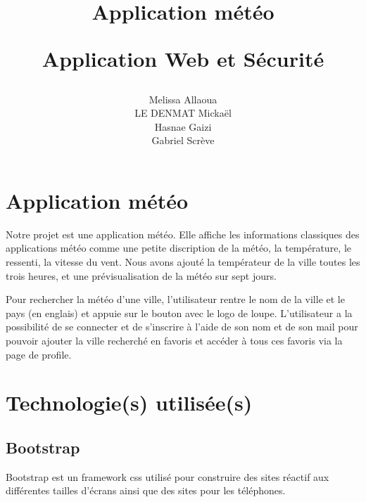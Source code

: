 \documentclass[a4paper, 12pt, french]{article}
\title{
	\Huge
	\textbf{Application météo}
	\vspace{0.4cm}

	\LARGE
	Application Web et Sécurité
}
\author{
	Melissa Allaoua \\
	LE DENMAT Mickaël \\
	Hasnae Gaizi \\
	Gabriel Scrève
}
\begin{document}
	

	\newpage
	\renewcommand{\contentsname}{Table des matières}
	\tableofcontents

	\newpage
	\section{Application météo}
		Notre projet est une application météo. Elle affiche les informations classiques 
    	des applications météo comme une petite discription de la météo, la température,
		le ressenti, la vitesse du vent. Nous avons ajouté la températeur de 
   		la ville toutes les trois heures, et une prévisualisation de la météo sur sept jours.
		

		Pour rechercher la météo d'une ville, l'utilisateur rentre le nom de la ville et le pays
    	(en englais) et appuie sur le bouton avec le logo de loupe.
		L'utilisateur a la possibilité de se connecter et de s'inscrire à l'aide de son nom et de son
    	mail pour pouvoir ajouter la ville recherché en favoris et accéder à tous ces favoris via
    	la page de profile.

	\section{Technologie(s) utilisée(s)}
		\subsection{Bootstrap}
			Bootstrap est un framework css \cite*{Bootstrap} utilisé pour construire des sites
			réactif aux différentes tailles d'écrans ainsi que des sites pour les
			téléphones.
\end{document}
